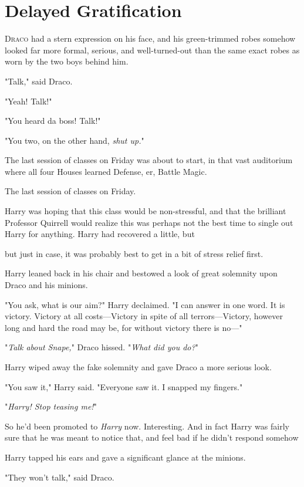 \chapter{Delayed Gratification}

\lettrine{D}{raco} had a stern expression on his face, and his green-trimmed robes somehow
looked far more formal, serious, and well-turned-out than the same exact robes
as worn by the two boys behind him.

"Talk," said Draco.

"Yeah! Talk!"

"You heard da boss! Talk!"

"You two, on the other hand, \emph{shut up.}"

The last session of classes on Friday was about to start, in that vast
auditorium where all four Houses learned Defense, er, Battle Magic.

The last session of classes on Friday.

Harry was hoping that this class would be non-stressful, and that the brilliant
Professor Quirrell would realize this was perhaps not the best time to single
out Harry for anything. Harry had recovered a little, but{\el}

{\el} but just in case, it was probably best to get in a bit of stress relief
first.

Harry leaned back in his chair and bestowed a look of great solemnity upon
Draco and his minions.

"You ask, what is our aim?" Harry declaimed. "I can answer in one word. It is
victory. Victory at all costs---Victory in spite of all terrors---Victory,
however long and hard the road may be, for without victory there is no---"

"\emph{Talk about Snape,}" Draco hissed. "\emph{What did you do?}"

Harry wiped away the fake solemnity and gave Draco a more serious look.

"You saw it," Harry said. "Everyone saw it. I snapped my fingers."

"\emph{Harry! Stop teasing me!}"

So he'd been promoted to \emph{Harry} now. Interesting. And in fact Harry was
fairly sure that he was meant to notice that, and feel bad if he didn't respond
somehow{\el}

Harry tapped his ears and gave a significant glance at the minions.

"They won't talk," said Draco.

